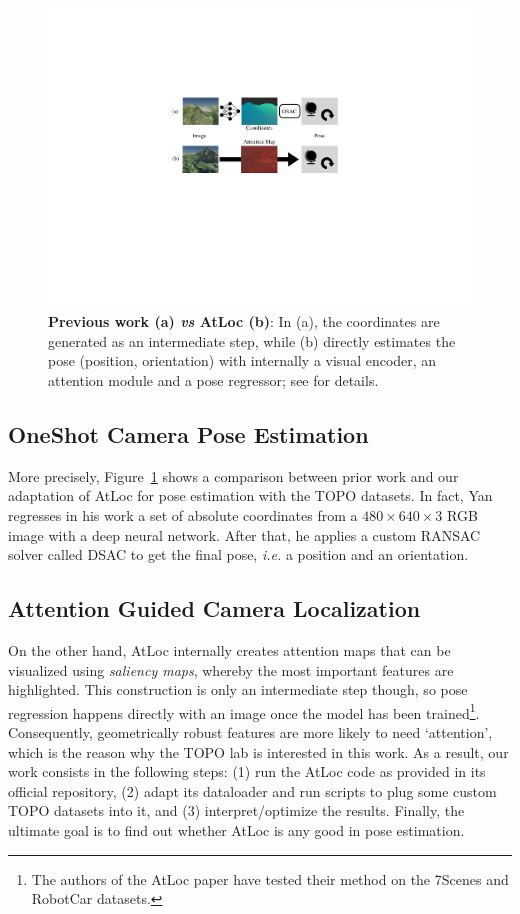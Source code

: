 \documentclass[10pt,conference,compsocconf]{IEEEtran}
\begin{document}
\begin{figure}[hbpt]
\scriptsize
\includegraphics[width=\linewidth]{images/ONESHOTvsATLOC}
\caption{\textbf{Previous work (a) \emph{vs} AtLoc (b)}: In (a), the coordinates are generated as an intermediate step, while (b) directly estimates the pose (position, orientation) with internally a visual encoder, an attention module and a pose regressor; see \cite{wang2019atloc} for details.}
\label{fig:oneshot-atloc}
\end{figure}

\subsection{OneShot Camera Pose Estimation}

More precisely, Figure~\ref{fig:oneshot-atloc} shows a comparison between prior work and our adaptation of AtLoc for pose estimation with the TOPO datasets. In fact, Yan regresses in his work \cite{yan2020oneshot} a set of absolute coordinates from a $480\times 640\times 3$ RGB image with a deep neural network. After that, he applies a custom RANSAC solver called DSAC \cite{brachmann2018dsac} to get the final pose, \emph{i.e.} a position and an orientation.


\subsection{Attention Guided Camera Localization}

On the other hand, AtLoc internally creates attention maps that can be visualized using \emph{saliency maps}, whereby the most important features are highlighted. This construction is only an intermediate step though, so pose regression happens directly with an image once the model has been trained\footnote{The authors of the AtLoc paper have tested their method on the 7Scenes and RobotCar datasets.}. Consequently, geometrically robust features are more likely to need `attention', which is the reason why the TOPO lab is interested in this work. As a result, our work consists in the following steps: (1) run the AtLoc code as provided in its official repository, (2) adapt its dataloader and run scripts to plug some custom TOPO datasets into it, and (3) interpret/optimize the results. Finally, the ultimate goal is to find out whether AtLoc is any good in pose estimation.
\end{document}
